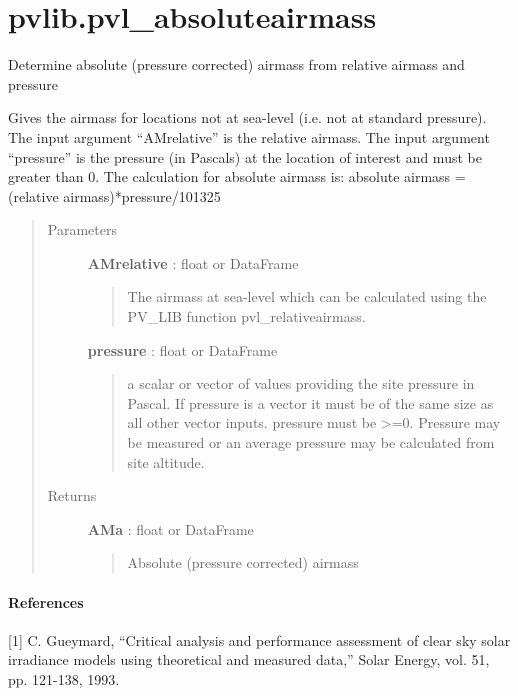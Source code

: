 \documentclass[letterpaper,10pt,english]{sphinxmanual}
\begin{document}
\section{pvlib.pvl\_absoluteairmass}
\label{stubs/pvlib.pvl_absoluteairmass::doc}\label{stubs/pvlib.pvl_absoluteairmass:pvlib-pvl-absoluteairmass}

\begin{fulllineitems}
\label{stubs/pvlib.pvl_absoluteairmass:pvlib.pvl_absoluteairmass}
Determine absolute (pressure corrected) airmass from relative airmass and pressure

Gives the airmass for locations not at sea-level (i.e. not at standard
pressure). The input argument ``AMrelative'' is the relative airmass. The
input argument ``pressure'' is the pressure (in Pascals) at the location
of interest and must be greater than 0. The calculation for
absolute airmass is:
absolute airmass = (relative airmass)*pressure/101325
\begin{quote}\begin{description}
\item[{Parameters}] \leavevmode
\textbf{AMrelative} : float or DataFrame
\begin{quote}

The airmass at sea-level which can be calculated using the 
PV\_LIB function pvl\_relativeairmass.
\end{quote}

\textbf{pressure} : float or DataFrame
\begin{quote}

a scalar or vector of values providing the site pressure in
Pascal. If pressure is a vector it must be of the same size as all
other vector inputs. pressure must be \textgreater{}=0. Pressure may be measured
or an average pressure may be calculated from site altitude.
\end{quote}

\item[{Returns}] \leavevmode
\textbf{AMa} : float or DataFrame
\begin{quote}

Absolute (pressure corrected) airmass
\end{quote}

\end{description}\end{quote}




{\hyperref[stubs/pvlib.pvl_relativeairmass:pvlib.pvl_relativeairmass]{}}


\paragraph{References}

{[}1{]} C. Gueymard, ``Critical analysis and performance assessment of 
clear sky solar irradiance models using theoretical and measured data,''
Solar Energy, vol. 51, pp. 121-138, 1993.

\end{fulllineitems}
\end{document}
